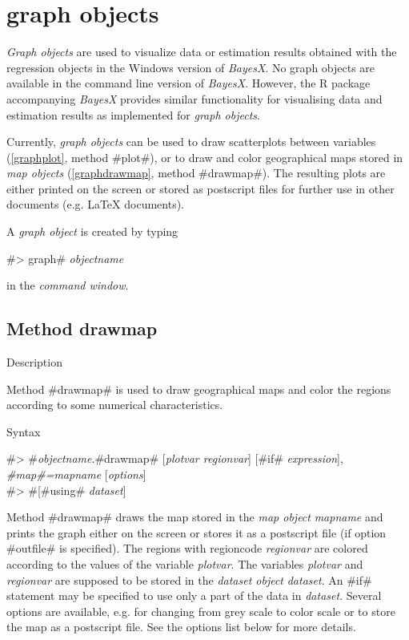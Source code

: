 \chapter{graph objects}
\label{graphobj}  

{\em Graph objects} are used to visualize data or estimation results obtained with the regression objects in the Windows
version of {\em BayesX}. No graph objects are available in the command line version of {\it BayesX}. However, the R package
accompanying {\it BayesX} provides similar functionality for visualising data and estimation results as implemented for {\it
graph objects}.

Currently, {\em graph objects} can be used to draw scatterplots between variables (\autoref{graphplot}, method #plot#), or to
draw and color geographical maps stored in {\em map objects} (\autoref{graphdrawmap}, method #drawmap#). The resulting plots
are either printed on the screen or stored as postscript files for further use in other documents (e.g. \LaTeX\/ documents).

A {\em graph object} is created by typing

#> graph# {\em objectname}

in the {\em command window}.


\clearpage


\section{Method drawmap}
\label{graphdrawmap} 

\begin{stanza}{Description}

Method #drawmap# is used to draw geographical maps and color the
regions according to some numerical characteristics.
\end{stanza}

\begin{stanza}{Syntax}

 #> #{\em objectname}.#drawmap#  [{\em plotvar regionvar}] [#if# {\em expression}], {\em #map#=mapname} [{\em options}]\\
 #> #[#using# {\em dataset}]

Method #drawmap# draws the map stored in the {\em map object} {\em
mapname} and prints the graph either on the screen or stores it as
a postscript file (if option #outfile# is specified). The regions
with regioncode {\em regionvar} are colored according to the
values of the variable {\em plotvar}. The variables {\em plotvar}
and {\em regionvar} are supposed to be stored in the {\em dataset
object} {\em dataset}. An #if# statement may be specified to use
only a part of the data in {\em dataset}. Several options are
available, e.g. for changing from grey scale to color scale or to
store the map as a postscript file. See the options list below for
more details.
\end{stanza}

